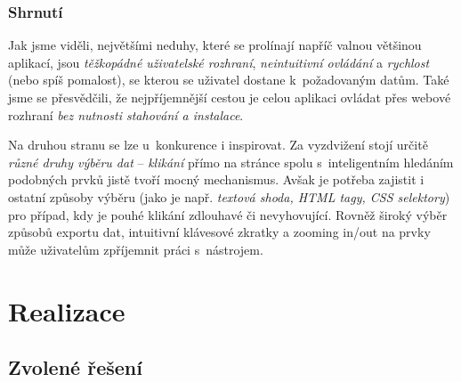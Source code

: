 \documentclass[thesis=B,czech]{FITthesis2}[2012/06/26]
\begin{document}
	\subsection{Shrnutí}
	Jak jsme viděli, největšími neduhy, které se prolínají napříč valnou většinou aplikací, jsou \emph{těžkopádné uživatelské rozhraní}, \emph{neintuitivní ovládání} a \emph{rychlost} (nebo spíš pomalost), se kterou se uživatel dostane k~požadovaným datům. Také jsme se přesvědčili, že nejpříjemnější cestou je celou aplikaci ovládat přes webové rozhraní  \emph{bez nutnosti stahování a instalace}.
	
	Na druhou stranu se lze u~konkurence i inspirovat. Za vyzdvižení stojí určitě \emph{různé druhy výběru dat} -- \emph{klikání} přímo na stránce spolu s~inteligentním hledáním podobných prvků jistě tvoří mocný mechanismus. Avšak je potřeba zajistit i ostatní způsoby výběru (jako je např. \emph{textová shoda, HTML tagy, CSS selektory}) pro případ, kdy je pouhé klikání zdlouhavé či nevyhovující. Rovněž široký výběr způsobů exportu dat, intuitivní klávesové zkratky a zooming in/out na prvky může uživatelům zpříjemnit práci s~nástrojem.
	
	
	\chapter{Realizace}
	
	\section{Zvolené řešení}
	
	
	
	
	\begin{conclusion}
	\end{conclusion}
	
	
	
\end{document}
